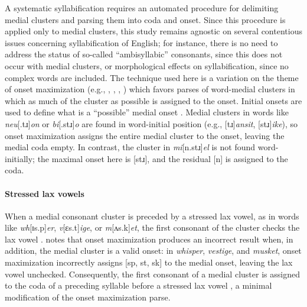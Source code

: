 A systematic syllabification requires an automated procedure for delimiting medial clusters and parsing them into coda and onset. Since this procedure is applied only to medial clusters, this study remains agnostic on several contentious issues concerning syllabification of English; for instance, there is no need to address the status of so-called ``ambisyllabic'' consonants, since this does not occur with medial clusters, or morphological effects on syllabification, since no complex words are included. The technique used here is a variation on the theme of onset maximization (e.g., \citealp[42f.]{Kahn1976}, \citealp{Kurylowicz1948}, \citealp[75]{Pulgram1970}, \citealp[][358f.]{Selkirk1982b}) which favors parses of word-medial clusters in which as much of the cluster as possible is assigned to the onset. Initial onsets are used to define what is a ``possible'' medial onset \citep[though cf.][36]{Fischer-Jorgensen1952}. Medial clusters in words like \emph{neu}[.tɹ]\emph{on} or \emph{bi}[.stɹ]\emph{o} are found in word-initial position (e.g., [tɹ]\emph{ansit}, [stɹ]\emph{ike}), so onset maximization assigns the entire medial cluster to the onset, leaving the medial coda empty. In contrast, the cluster in \emph{mi}[n.stɹ]\emph{el} is not found word-initially; the maximal onset here is [stɹ], and the residual [n] is assigned to the coda.


\paragraph{Stressed lax vowels} When a medial consonant cluster is preceded by a stressed lax vowel, as in words like \emph{wh}[ɪs.p]\emph{er}, \emph{v}[ɛs.t]\emph{ige}, or \emph{m}[ʌs.k]\emph{et}, the first consonant of the cluster checks the lax vowel \citep[e.g.,][3]{Hammond1997}. \citet[][55]{Harris1994} notes that onset maximization produces an incorrect result when, in addition, the medial cluster is a valid onset: in \emph{whisper}, \emph{vestige}, and \emph{musket}, onset maximization incorrectly assigns [sp, st, sk] to the medial onset, leaving the lax vowel unchecked. Consequently, the first consonant of a medial cluster is assigned to the coda of a preceding syllable before a stressed lax vowel \citep[cf.][48]{Pulgram1970}, a minimal modification of the onset maximization parse.

